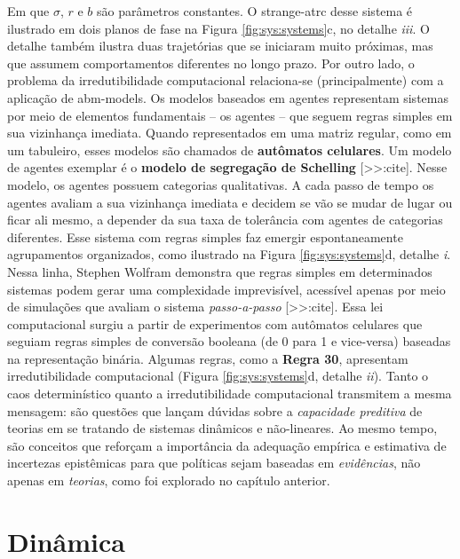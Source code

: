 \documentclass[./main.tex]{subfiles}
\begin{document}
Em que $\sigma$, $r$ e $b$ são parâmetros constantes. O \gls{strange-atrc} desse sistema é ilustrado em dois planos de fase na Figura \ref{fig:sys:systems}c, no detalhe \textrm{\textit{iii}}. O detalhe também ilustra duas trajetórias que se iniciaram muito próximas, mas que assumem comportamentos diferentes no longo prazo. Por outro lado, o problema da irredutibilidade computacional relaciona-se (principalmente) com a aplicação de \gls{abm-models}. Os modelos baseados em agentes representam sistemas por meio de elementos fundamentais – os agentes – que seguem regras simples em sua vizinhança imediata. Quando representados em uma matriz regular, como em um tabuleiro, esses modelos são chamados de \textbf{autômatos celulares}. Um modelo de agentes exemplar é o \textbf{modelo de segregação de Schelling} [>>:cite]. Nesse modelo, os agentes possuem categorias qualitativas. A cada passo de tempo os agentes avaliam a sua vizinhança imediata e decidem se vão se mudar de lugar ou ficar ali mesmo, a depender da sua taxa de tolerância com agentes de categorias diferentes. Esse sistema com regras simples faz emergir espontaneamente agrupamentos organizados, como ilustrado na Figura \ref{fig:sys:systems}d, detalhe \textrm{\textit{i}}. Nessa linha, Stephen Wolfram demonstra que regras simples em determinados sistemas podem gerar uma complexidade imprevisível, acessível apenas por meio de simulações que avaliam o sistema \textit{passo-a-passo} [>>:cite]. Essa lei computacional surgiu a partir de experimentos com autômatos celulares que seguiam regras simples de conversão booleana (de 0 para 1 e vice-versa) baseadas na representação binária. Algumas regras, como a \textbf{Regra 30}, apresentam irredutibilidade computacional (Figura \ref{fig:sys:systems}d, detalhe \textrm{\textit{ii}}). Tanto o caos determinístico quanto a irredutibilidade computacional transmitem a mesma mensagem: são questões que lançam dúvidas sobre a \textit{capacidade preditiva} de teorias em se tratando de sistemas dinâmicos e não-lineares. Ao mesmo tempo, são conceitos que reforçam a importância da adequação empírica e estimativa de incertezas epistêmicas para que políticas sejam baseadas em \textit{evidências}, não apenas em \textit{teorias}, como foi explorado no capítulo anterior.

\section{Dinâmica} \label{sec:sys:dynamics}
\end{document}
